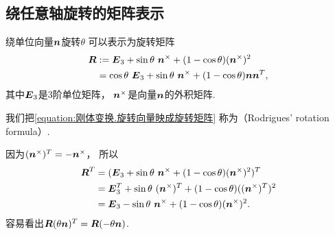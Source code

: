 \subsection{绕任意轴旋转的矩阵表示}
绕单位向量\(\boldsymbol{n}\)旋转\(\theta\)
可以表示为旋转矩阵\begin{align}\label{equation:刚体变换.旋转向量映成旋转矩阵}
	\boldsymbol{R}
	&:= \boldsymbol{E}_3
	+ \sin\theta ~ \boldsymbol{n}^\times
	+ (1 - \cos\theta) (\boldsymbol{n}^\times)^2
	\\
	&= \cos\theta ~ \boldsymbol{E}_3
	+ \sin\theta ~ \boldsymbol{n}^\times
	+ (1 - \cos\theta) \boldsymbol{n} \boldsymbol{n}^T,
\end{align}
其中\(\boldsymbol{E}_3\)是3阶单位矩阵，
\(\boldsymbol{n}^\times\)是向量\(\boldsymbol{n}\)的外积矩阵.

我们把\cref{equation:刚体变换.旋转向量映成旋转矩阵}
称为（Rodrigues' rotation formula）.

因为\((\boldsymbol{n}^\times)^T = -\boldsymbol{n}^\times\)，
所以\begin{align*}
	\boldsymbol{R}^T
	&= (
		\boldsymbol{E}_3
		+ \sin\theta ~ \boldsymbol{n}^\times
		+ (1 - \cos\theta) (\boldsymbol{n}^\times)^2
	)^T
	\\
	&= \boldsymbol{E}_3^T
	+ \sin\theta ~ (\boldsymbol{n}^\times)^T
	+ (1 - \cos\theta) ((\boldsymbol{n}^\times)^T)^2
	\\
	&= \boldsymbol{E}_3
	- \sin\theta ~ \boldsymbol{n}^\times
	+ (1 - \cos\theta) (\boldsymbol{n}^\times)^2.
\end{align*}
容易看出\(\boldsymbol{R}(\theta\boldsymbol{n})^T = \boldsymbol{R}(-\theta\boldsymbol{n})\).

